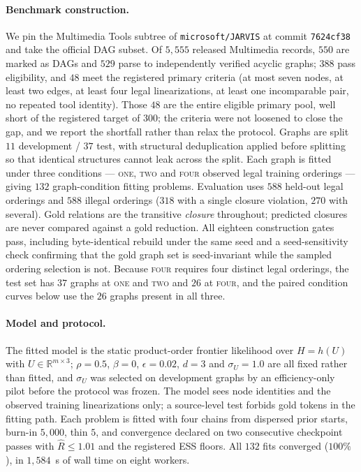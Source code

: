 \paragraph{Benchmark construction.}
We pin the Multimedia Tools subtree of \texttt{microsoft/JARVIS} at commit
\texttt{7624cf38} and take the official DAG subset. Of $5{,}555$ released
Multimedia records, $550$ are marked as DAGs and $529$ parse to independently
verified acyclic graphs; $388$ pass eligibility, and $48$ meet the registered
primary criteria (at most seven nodes, at least two edges, at least four legal
linearizations, at least one incomparable pair, no repeated tool identity).
Those $48$ are the entire eligible primary pool, well short of the registered
target of $300$; the criteria were not loosened to close the gap, and we report
the shortfall rather than relax the protocol. Graphs are split $11$ development
/ $37$ test, with structural deduplication applied before splitting so that
identical structures cannot leak across the split. Each graph is fitted under
three conditions --- \textsc{one}, \textsc{two} and \textsc{four} observed legal
training orderings --- giving $132$ graph-condition fitting problems. Evaluation
uses $588$ held-out legal orderings and $588$ illegal orderings ($318$ with a
single closure violation, $270$ with several). Gold relations are the transitive
\emph{closure} throughout; predicted closures are never compared against a gold
reduction. All eighteen construction gates pass, including byte-identical
rebuild under the same seed and a seed-sensitivity check confirming that the
gold graph set is seed-invariant while the sampled ordering selection is not.
Because \textsc{four} requires four distinct legal orderings, the test set has
$37$ graphs at \textsc{one} and \textsc{two} and $26$ at \textsc{four}, and the
paired condition curves below use the $26$ graphs present in all three.

\paragraph{Model and protocol.}
The fitted model is the static product-order frontier likelihood over
$H = h(U)$ with $U \in \mathbb{R}^{m \times 3}$; $\rho = 0.5$, $\beta = 0$,
$\epsilon = 0.02$, $d = 3$ and $\sigma_U = 1.0$ are all fixed rather than
fitted, and $\sigma_U$ was selected on development graphs by an efficiency-only
pilot before the protocol was frozen. The model sees node identities and the
observed training linearizations only; a source-level test forbids gold tokens
in the fitting path. Each problem is fitted with four chains from dispersed
prior starts, burn-in $5{,}000$, thin $5$, and convergence declared on two
consecutive checkpoint passes with $\widehat{R} \leq 1.01$ and the registered
ESS floors. All $132$ fits converged ($100\%$), in $1{,}584$~s of wall time on
eight workers.

